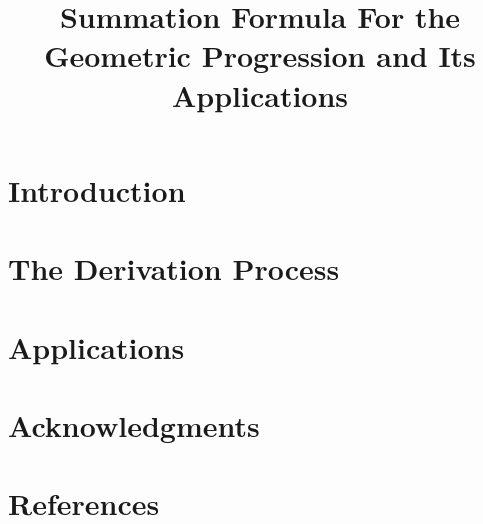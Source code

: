 \title{Summation Formula For the Geometric Progression and Its Applications}
\maketitle



\setcounter{tocdepth}{2}\tableofcontents\clearpage

\section{Introduction}


\section{The Derivation Process}


\section{Applications}


\section{Acknowledgments}
\clearpage

\section{References}
\clearpage

\appendix


